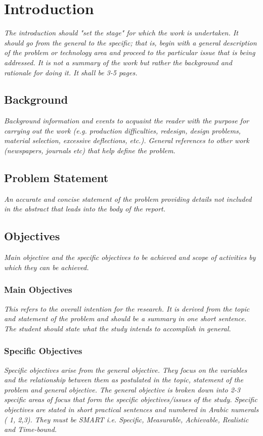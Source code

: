 \chapter{Introduction}
\label{cha:Introduction}      %

\emph{The introduction should "set the stage" for which the work is undertaken. It should go from the general to the specific; that is, begin with a general description of the problem or technology area and proceed to the particular issue that is being addressed. It is not a summary of the work but rather the background and rationale for doing it. It shall be 3-5 pages.}

\section{Background}
\emph{Background information and events to acquaint the reader with the purpose for carrying out the work (e.g. production difficulties, redesign, design problems, material selection, excessive deflections, etc.).
General references to other work (newspapers, journals etc) that help define the problem.}

\section{Problem Statement}
\emph{An accurate and concise statement of the problem providing details not included in the abstract that leads into the body of the report.}

\section{Objectives}
\emph{Main objective and the specific objectives to be achieved and scope of activities by which they can be achieved.}

\subsection{Main Objectives}
\emph{This refers to the overall intention for the research. 
	It is derived from the topic and statement of the problem and should be a summary in one short sentence. 
	The student should state what the study intends to accomplish in general.}

\subsection{Specific Objectives}
\emph{Specific objectives arise from the general objective.
	They focus on the variables and the relationship between them as postulated in the topic, statement of the problem and general objective. 
	The general objective is broken down into 2-3 specific areas of focus that form the specific objectives/issues of the study.
	Specific objectives are stated in short practical sentences and numbered in Arabic numerals ( 1, 2,3).
	They must be SMART i.e. Specific, Measurable, Achievable, Realistic and Time-bound.}

